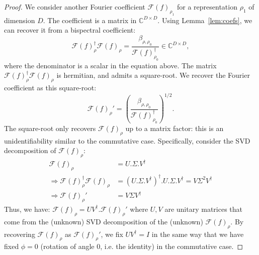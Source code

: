 \documentclass{article}
\begin{document}
\begin{proof}
    We consider another Fourier coefficient $\mathcal{F}(f)_{\rho_1}$ for a representation $\rho_1$ of dimension $D$. The coefficient is a matrix in $\mathbb{C}^{D \times D}$. Using Lemma~\ref{lem:coefs}, we can recover it from a bispectral coefficient:
    \begin{equation}
        \mathcal{F}(f)_{\rho}^\dagger\mathcal{F}(f)_{\rho}
        = \frac{\beta_{\rho, \rho_0}}{\mathcal{F}(f)_{\rho_0}^\dagger} \in \mathbb{C}^{D \times D},
    \end{equation}
    where the denominator is a scalar in the equation above. The matrix $\mathcal{F}(f)_{\rho}^\dagger\mathcal{F}(f)_{\rho}$ is hermitian, and admits a square-root. We recover the Fourier coefficient as this square-root:
      \begin{equation}
        \mathcal{F}(f)_{\rho}'
        = \left(\frac{\beta_{\rho, \rho_0}}{\mathcal{F}(f)_{\rho_0}^\dagger}
        \right)^{1/2}.
    \end{equation}
    The square-root only recovers $\mathcal{F}(f)_{\rho}$ up to a matrix factor: this is an unidentifiability similar to the commutative case. Specifically, consider the SVD decomposition of $\mathcal{F}(f)_{\rho}$:
    \begin{align*}
        \mathcal{F}(f)_{\rho}
        &= U.\Sigma.V^\dagger\\
        \Rightarrow
         \mathcal{F}(f)_{\rho}^\dagger\mathcal{F}(f)_{\rho}
        &= (U.\Sigma.V^\dagger)^\dagger. U.\Sigma.V^\dagger
        = V \Sigma^2 V^\dagger\\
        \Rightarrow
        \mathcal{F}(f)_{\rho}'
        &= V \Sigma V^\dagger
    \end{align*}
    Thus, we have: $\mathcal{F}(f)_{\rho} = UV^\dagger.\mathcal{F}(f)_{\rho}' $ where $U, V$ are unitary matrices that come from the (unknown) SVD decomposition of the (unknown) $\mathcal{F}(f)_{\rho}$. By recovering $\mathcal{F}(f)_{\rho}$ as $\mathcal{F}(f)_{\rho}'$, we fix $UV^\dagger=I$ in the same way that we have fixed $\phi = 0$ (rotation of angle 0, i.e. the identity) in the commutative case.


\end{proof}
\end{document}

